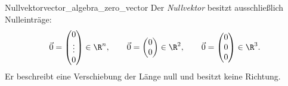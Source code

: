 \begin{DefinitionBox}{Nullvektor}{vector_algebra_zero_vector}
  Der \emph{Nullvektor}  besitzt ausschließlich
  Nulleinträge:
  \[
    \vec 0=
    \begin{pmatrix}0\\\vdots\\0\end{pmatrix}\in\R^n,
    \qquad
    \vec 0=\begin{pmatrix}0\\0\end{pmatrix}\in\R^2,
    \qquad
    \vec 0=\begin{pmatrix}0\\0\\0\end{pmatrix}\in\R^3.
  \]
  Er beschreibt eine Verschiebung der Länge null und besitzt keine Richtung.
\end{DefinitionBox}
